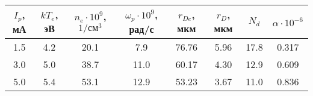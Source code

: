 \begin{tabular}{cccccccc}
\toprule
$I_p$, мА & $kT_e$, эВ & $n_e \cdot 10^{9}$, $1 / \text{см}^3$ & $\omega_p \cdot 10^{9}$, рад/с & $r_{De}$, мкм & $r_{D}$, мкм & $N_{d}$ & $\alpha \cdot 10^{-6}$ \\
\midrule
1.5 & 4.2 & 20.1 & 7.9 & 76.76 & 5.96 & 17.8 & 0.317 \\
3.0 & 5.0 & 38.7 & 11.0 & 60.17 & 4.30 & 12.9 & 0.609 \\
5.0 & 5.4 & 53.1 & 12.9 & 53.23 & 3.67 & 11.0 & 0.836 \\
\bottomrule
\end{tabular}
